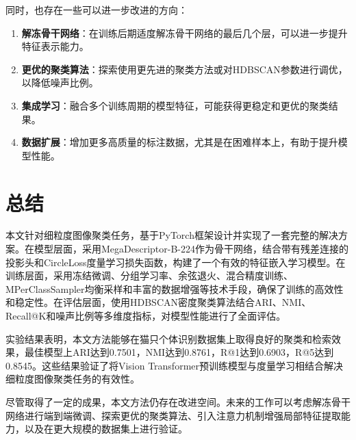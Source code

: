 \documentclass[a4paper]{article}
\begin{document}
同时，也存在一些可以进一步改进的方向：

\begin{enumerate}
    \item \textbf{解冻骨干网络}：在训练后期适度解冻骨干网络的最后几个层，可以进一步提升特征表示能力。
    \item \textbf{更优的聚类算法}：探索使用更先进的聚类方法或对HDBSCAN参数进行调优，以降低噪声比例。
    \item \textbf{集成学习}：融合多个训练周期的模型特征，可能获得更稳定和更优的聚类结果。
    \item \textbf{数据扩展}：增加更多高质量的标注数据，尤其是在困难样本上，有助于提升模型性能。
\end{enumerate}

\section{总结}
\label{sec:conclusion}

本文针对细粒度图像聚类任务，基于PyTorch框架设计并实现了一套完整的解决方案。在模型层面，采用MegaDescriptor-B-224作为骨干网络，结合带有残差连接的投影头和CircleLoss度量学习损失函数，构建了一个有效的特征嵌入学习模型。在训练层面，采用冻结微调、分组学习率、余弦退火、混合精度训练、MPerClassSampler均衡采样和丰富的数据增强等技术手段，确保了训练的高效性和稳定性。在评估层面，使用HDBSCAN密度聚类算法结合ARI、NMI、Recall@K和噪声比例等多维度指标，对模型性能进行了全面评估。

实验结果表明，本文方法能够在猫只个体识别数据集上取得良好的聚类和检索效果，最佳模型上ARI达到0.7501，NMI达到0.8761，R@1达到0.6903，R@5达到0.8545。这些结果验证了将Vision Transformer预训练模型与度量学习相结合解决细粒度图像聚类任务的有效性。

尽管取得了一定的成果，本文方法仍存在改进空间。未来的工作可以考虑解冻骨干网络进行端到端微调、探索更优的聚类算法、引入注意力机制增强局部特征提取能力，以及在更大规模的数据集上进行验证。
\end{document}
